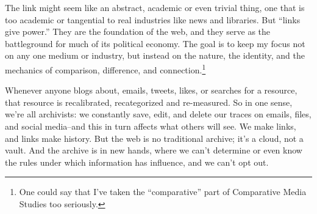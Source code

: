 The link might seem like an abstract, academic or even trivial thing, one that is too academic or tangential to real industries like news and libraries. But ``links give power.'' They are the foundation of the web, and they serve as the battleground for much of its political economy. %
The goal is to keep my focus not on any one medium or industry, but instead on the nature, the identity, and the mechanics of comparison, difference, and connection.\footnote{One could say that I've taken the ``comparative'' part of Comparative Media Studies too seriously.}

Whenever anyone blogs about, emails, tweets, likes, or searches for a resource, that resource is recalibrated, recategorized and re-measured. So in one sense, we're all archivists: we constantly save, edit, and delete our traces on emails, files, and social media--and this in turn affects what others will see. We make links, and links make history. But the web is no traditional archive; it's a cloud, not a vault. And the archive is in new hands, where we can't determine or even know the rules under which information has influence, and we can't opt out.


